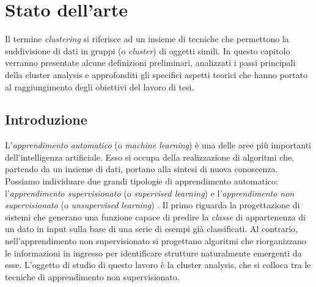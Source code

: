 \chapter{Stato dell'arte}
\label{capitolo2}
\thispagestyle{empty}

\noindent
Il termine \textit{clustering} si riferisce ad un insieme di tecniche che permettono la suddivisione di dati in gruppi (o \textit{cluster}) di oggetti simili. In questo capitolo verranno presentate alcune definizioni preliminari, analizzati i passi principali della cluster analysis e approfonditi gli specifici aspetti teorici che hanno portato al raggiungimento degli obiettivi del lavoro di tesi.

\section{Introduzione}
L'\textit{apprendimento automatico} (o \textit{machine learning}) \`e una delle aree pi\`u importanti dell'intelligenza artificiale. Esso si occupa della realizzazione di algoritmi che, partendo da un insieme di dati, portano alla sintesi di nuova conoscenza. Possiamo individuare due grandi tipologie di apprendimento automatico: l'\textit{apprendimento supervisionato} (o \textit{supervised learning}) e l'\textit{apprendimento non supervisionato} (o \textit{unsupervised learning}) \cite{Mitchell1997}. Il primo riguarda la progettazione di sistemi che generano una funzione capace di predire la \textit{classe} di appartenenza di un dato in input sulla base di una serie di esempi gi\`a classificati. Al contrario, nell'apprendimento non supervisionato si progettano algoritmi che riorganizzano le informazioni in ingresso per identificare strutture naturalmente emergenti da esse. L'oggetto di studio di questo lavoro \`e la cluster analysis, che si colloca tra le tecniche di apprendimento non supervisionato. 

